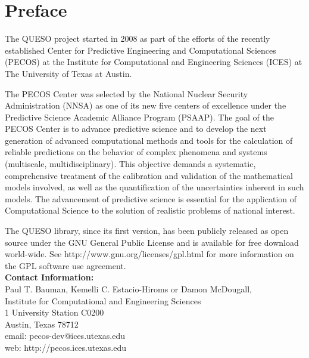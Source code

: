 
\clearpage
\thispagestyle{empty}
\chapter*{Preface}
$~$\\
The QUESO project started in 2008 as part
of the efforts of the recently established Center for Predictive Engineering and Computational Sciences (PECOS)
at the Institute for Computational and Engineering Sciences (ICES) at The University of Texas at Austin.

The PECOS Center was selected by the National Nuclear Security Administration (NNSA) as one of its new five centers of excellence
under the Predictive Science Academic Alliance Program (PSAAP).
The goal of the PECOS Center is
to advance predictive science and to develop the next generation of advanced computational methods and tools
for the calculation of reliable predictions on the behavior of complex phenomena and systems (multiscale, multidisciplinary).
This objective demands a systematic, comprehensive treatment of the calibration and validation of the mathematical models involved,
as well as the quantification of the uncertainties inherent in such models.
The advancement of predictive science is essential for the application of Computational Science to the solution of realistic problems of national interest.

The QUESO library, since its first version, has been publicly released as open source
under the GNU General Public License and is available for free download world-wide.
See http://www.gnu.org/licenses/gpl.html for more information on the GPL software use agreement.\\

\noindent
{\bf Contact Information:}\\
Paul T. Bauman,
Kemelli C. Estacio-Hiroms or
Damon McDougall,
\\
Institute for Computational and Engineering Sciences\\
1 University Station C0200\\
Austin, Texas 78712\\
email: pecos-dev@ices.utexas.edu\\
web: http://pecos.ices.utexas.edu\\
$~$\\


